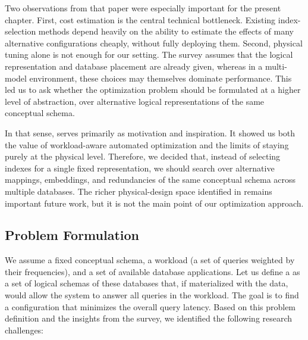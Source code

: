 Two observations from that paper were especially important for the present chapter. First, cost estimation is the central technical bottleneck. Existing index-selection methods depend heavily on the ability to estimate the effects of many alternative configurations cheaply, without fully deploying them. Second, physical tuning alone is not enough for our setting. The survey assumes that the logical representation and database placement are already given, whereas in a multi-model environment, these choices may themselves dominate performance. This led us to ask whether the optimization problem should be formulated at a higher level of abstraction, over alternative logical representations of the same conceptual schema.

In that sense,  serves primarily as motivation and inspiration. It showed us both the value of workload-aware automated optimization and the limits of staying purely at the physical level. Therefore, we decided that, instead of selecting indexes for a single fixed representation, we should search over alternative mappings, embeddings, and redundancies of the same conceptual schema across multiple databases. The richer physical-design space identified in  remains important future work, but it is not the main point of our optimization approach.

\subsection{Problem Formulation}

We assume a fixed conceptual schema, a workload (a set of queries weighted by their frequencies), and a set of available database applications. Let us define a  as a set of logical schemas of these databases that, if materialized with the data, would allow the system to answer all queries in the workload. The goal is to find a configuration that minimizes the overall query latency. Based on this problem definition and the insights from the survey, we identified the following research challenges:


